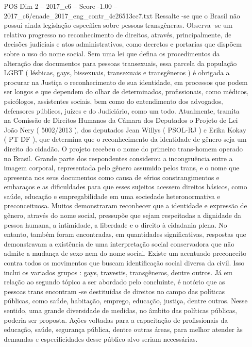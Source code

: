 \begin{textsample}{POS Dim 2 – 2017\_c6 – Score -1.00 – 2017\_c6/enade\_2017\_eng\_contr\_4e26513cc7.txt}
Ressalte -se que o Brasil não possui ainda legislação específica sobre pessoas transgêneras.
Observa -se um relativo progresso no reconhecimento de direitos, através, principalmente, de decisões judiciais e atos administrativos, como decretos e portarias que dispõem sobre o uso do nome social.
Sem uma lei que defina os procedimentos da alteração dos documentos para pessoas transexuais, essa parcela da população LGBT ( lésbicas, gays, bissexuais, transexuais e transgêneros ) é obrigada a procurar na Justiça o reconhecimento de sua identidade, em processos que podem ser longos e que dependem do olhar de determinados, profissionais, como médicos, psicólogos, assistentes sociais, bem como do entendimento dos advogados, defensores públicos, juízes e do Judiciário, como um todo.
Atualmente, tramita na Comissão de Direitos Humanos da Câmara dos Deputados o Projeto de Lei João Nery ( 5002/2013 ), dos deputados Jean Willys ( PSOL-RJ ) e Erika Kokay ( PT-DF ), que determina que o reconhecimento da identidade de gênero seja um direito do cidadão.
O projeto recebeu o nome do primeiro trans-homem operado no Brasil.
Grande parte dos respondentes considerou a incongruência entre a imagem corporal, representada pelo gênero assumido pelos trans, e o nome que apresenta nos seus documentos como causa de sérios constrangimentos e embaraços e as dificuldades para que esses sujeitos acessem direitos básicos, como saúde, educação e empregabilidade em uma sociedade heteronormativa e preconceituosa.
Muitos demonstraram reconhecer que a identidade e expressão de gênero, através do nome social, pressupõe que sejam respeitadas a dignidade da pessoa humana, a intimidade, a liberdade e o direito à cidadania plena.
No entanto, também foram encontradas, em quantidades significativas, respostas que demonstravam a existência de uma interpretação social conservadora que não admite a mudança de sexo nem do nome social.
Existe um acentuado preconceito contra todos os movimentos que buscam identificação social diversa da civil.
Isso inclui os variados grupos : gays, travestis, transgêneros, dentre outros.
Já em relação ao segundo tópico a ser abordado pelo concluinte, é notório que as pessoas trans encontram -se destituídas de direitos no campo das políticas públicas, como saúde, habitação, emprego, educação, justiça, dentre outros.
Nesse sentido, uma grande diversidade de medidas, no âmbito das políticas públicas, poderia ser proposta.
Ações voltadas para a capacitação de profissionais da educação, saúde, segurança pública, dentre outras áreas, para melhor atender às demandas e especificidades desse público alvo seriam necessárias.

\end{textsample}
